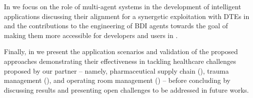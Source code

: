 In  we focus on the role of multi-agent systems in the development of intelligent applications discussing their alignment for a synergetic exploitation with \acp{DTE} in  and the contributions to the engineering of \ac{BDI} agents towards the goal of making them more accessible for developers and users in .

Finally, in  we present the application scenarios and validation of the proposed approaches demonstrating their effectiveness in tackling healthcare challenges proposed by our partner \ausl{}
-- namely, pharmaceutical supply chain (), trauma management (), and operating room management () --
before concluding by discussing results and presenting open challenges to be addressed in future works.